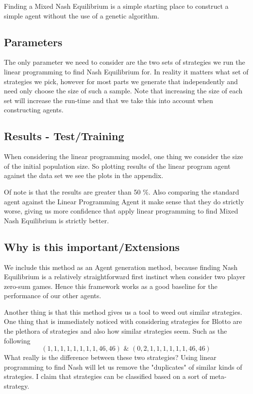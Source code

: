 \documentclass[12pt,letter]{article}
\begin{document}
Finding a Mixed Nash Equilibrium is a simple starting place to construct a simple agent without the use of a genetic algorithm.

\subsection{Parameters}
The only parameter we need to consider are the two sets of strategies we run the linear programming to find Nash Equilibrium for. In reality it matters what set of strategies we pick, however for most parts we generate that independently and need only choose the size of such a sample. Note that increasing the size of each set will increase the run-time and that we take this into account when constructing agents.

\subsection{Results - Test/Training}
When considering the linear programming model, one thing we consider the size of the initial population size. So plotting results of the linear program agent against the data set we see the plots in the appendix.

Of note is that the results are greater than 50 \%. Also comparing the standard agent against the Linear Programming Agent it make sense that they do strictly worse, giving us more confidence that apply linear programming to find Mixed Nash Equilibrium is strictly better.

\subsection{Why is this important/Extensions}
We include this method as an Agent generation method, because finding Nash Equilibrium is a relatively straightforward first instinct when consider two player zero-sum games. Hence this framework works as a good baseline for the performance of our other agents.

Another thing is that this method gives us a tool to weed out similar strategies. One thing that is immediately noticed with considering strategies for Blotto are the plethora of strategies and also how similar strategies seem. Such as the following
\[(1, 1, 1, 1, 1, 1, 1, 1, 46, 46) \,\, \& \,\, (0, 2, 1, 1, 1, 1, 1, 1, 46, 46)\]
What really is the difference between these two strategies? Using linear programming to find Nash will let us remove the "duplicates" of similar kinds of strategies. I claim that strategies can be classified based on a sort of meta-strategy. %
\end{document}

